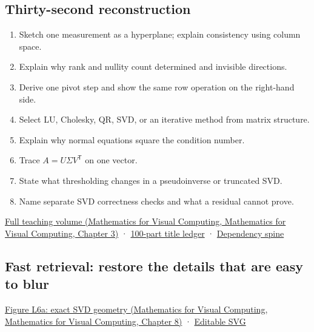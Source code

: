 \subsection{Thirty-second reconstruction}\label{appendix-932cf7182ff1-thirty-second-reconstruction}

\begin{enumerate}
\def\labelenumi{\arabic{enumi}.}
\tightlist
\item
  Sketch one measurement as a hyperplane; explain consistency using column space.
\item
  Explain why rank and nullity count determined and invisible directions.
\item
  Derive one pivot step and show the same row operation on the right-hand side.
\item
  Select LU, Cholesky, QR, SVD, or an iterative method from matrix structure.
\item
  Explain why normal equations square the condition number.
\item
  Trace \(A=U\Sigma V^\mathsf T\) on one vector.
\item
  State what thresholding changes in a pseudoinverse or truncated SVD.
\item
  Name separate SVD correctness checks and what a residual cannot prove.
\end{enumerate}

\href{../02-Mathematics-for-Visual-Computing/main.pdf\#nameddest=01-foundations-i-ch019-the-graphics-problem-hiding-inside-a-matrix-equation}{Full teaching volume (Mathematics for Visual Computing, Mathematics for Visual Computing, Chapter 3)} · \hyperref[appendix-fd090d982a15-phase-8---parts-701-800]{100-part title ledger} · \hyperref[appendix-4ad47bdd269a-phase-8---from-constraints-to-spectra]{Dependency spine}

\subsection{Fast retrieval: restore the details that are easy to blur}\label{appendix-932cf7182ff1-fast-retrieval-restore-the-details-that-are-easy-to-blur}

\href{../02-Mathematics-for-Visual-Computing/main.pdf\#nameddest=02-foundations-ii-ch024-figure-l6a---watch-the-same-directions-become-an-ellipse}{Figure L6a: exact SVD geometry (Mathematics for Visual Computing, Mathematics for Visual Computing, Chapter 8)} · \href{../current/Assets/Print/3491f9bdb1d7f300619c0d11a33ded7f3b3adfdc803929f353124f6903c784b4.svg}{Editable SVG}

